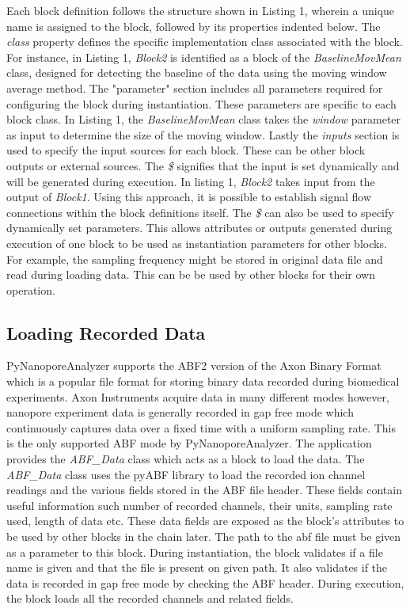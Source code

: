 \documentclass[journal]{IEEEtran}
\begin{document}


Each block definition follows the structure shown in Listing 1, wherein a unique name is assigned to the block, followed by its properties indented below. The \textit{class} property defines the specific implementation class associated with the block. For instance, in Listing 1, \textit{Block2} is identified as a block of the \textit{BaselineMovMean} class, designed for detecting the baseline of the data using the moving window average method. The "parameter" section includes all parameters required for configuring the block during instantiation. These parameters are specific to each block class. In Listing 1, the \textit{BaselineMovMean} class takes the \textit{window} parameter as input to determine the size of the moving window.  Lastly the \textit{inputs} section is used to specify the input sources for each block. These can be other block outputs or external sources. The \textit{\$} signifies that the input is set dynamically and will be generated during execution. In listing 1, \textit{Block2} takes input from the output of \textit{Block1}. Using this approach, it is possible to establish signal flow connections within the block definitions itself. The \textit{\$} can also be used to specify dynamically set parameters. This allows attributes or outputs generated during execution of one block to be used as instantiation parameters for other blocks. For example, the sampling frequency might be stored in original data file and read during loading data. This can be be used by other blocks for their own operation.

\subsection{Loading Recorded Data}
PyNanoporeAnalyzer supports the ABF2 version of the Axon Binary Format which is a popular file format for storing binary data recorded during biomedical experiments. Axon Instruments acquire data in many different modes however, nanopore experiment data is generally recorded in gap free mode which continuously captures data over a fixed time with a uniform sampling rate. This is the only supported ABF mode by PyNanoporeAnalyzer. The application provides the \textit{ABF\_Data} class which acts as a block to load the data. The \textit{ABF\_Data} class uses the pyABF library \cite{hardenPyABF2022} to load the recorded ion channel readings and the various fields stored in the ABF file header. These fields contain useful information such number of recorded channels, their units, sampling rate used, length of data etc. These data fields are exposed as the block's attributes to be used by other blocks in the chain later. The path to the abf file must be given as a parameter to this block. During instantiation, the block validates if a file name is given and that the file is present on given path. It also validates if the data is recorded in gap free mode by checking the ABF header. During execution, the block loads all the recorded channels and related fields.
\end{document}
